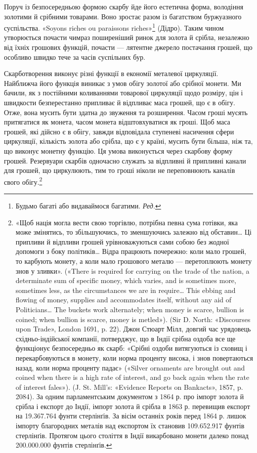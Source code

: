 Поруч із безпосередньою формою скарбу йде його естетична
форма, володіння золотими й срібними товарами. Воно зростає
разом із багатством буржуазного суспільства. «Soyons riches
ou paraissons riches»\footnote*{
Будьмо багаті або видаваймося багатими. \emph{Ред.}
} (Дідро). Таким чином утворюється почасти
чимраз поширеніший ринок для золота й срібла, незалежно від
їхніх грошових функцій, почасти — лятентне джерело постачання
грошей, що особливо швидко тече за часів суспільних бур.

Скарботворення виконує різні функції в економії металевої
циркуляції. Найближча його функція виникає з умов обігу золотої
або срібної монети. Ми бачили, як з постійними коливаннями
товарової циркуляції щодо розміру, цін і швидкости безперестанно
припливає й відпливає маса грошей, що є в обігу. Отже, вона
мусить бути здатна до звуження та розширення. Часом гроші
мусять притягатися як монета, часом монета відштовхуватися
як гроші. Щоб маса грошей, які дійсно є в обігу, завжди відповідала
ступеневі насичення сфери циркуляції, кількість золота
або срібла, що є у країні, мусить бути більша, ніж та, що виконує
монетну функцію. Ця умова виконується через скарбову
форму грошей. Резервуари скарбів одночасно служать за відпливні
й припливні канали для грошей, що циркулюють, тим то
гроші ніколи не переповнюють каналів свого обігу.\footnote{«Щоб нація могла вести свою торгівлю, потрібна певна сума
готівки, яка може змінятись, то збільшуючись, то зменшуючись залежно
від обставин\dots{} Ці припливи й відпливи грошей урівноважуються
сами собою без жодної допомоги з боку політиків\dots{} Відра працюють почережно:
коли мало грошей, то карбують монету, а коли мало грошового
металю — перетоплюють монету знов у зливки». («There is required for
carrying on the trade of the nation, a determinate sum of specific money,
which varies, and is sometimes more, sometimes less, as the circumstances
we are in require\dots{} This ebbing and flowing of money, supplies and accommodates
itself, without any aid of Politicians\dots{} The buckets work alternately;
when money is scarce, bullion is coined; when bullion is scarce, money
is metled»). (Sir D. North: «Discourses upon Trade», London 1691, p. 22).
Джон Стюарт Мілл, довгий час урядовець східньо-індійської компанії,
потверджує, що в Індії срібна оздоба все ще функціонує безпосередньо як
скарб: «Срібні оздоби витягуються із сховищ і перекарбовуються в монету,
коли норма проценту висока, і знов повертаються назад, коли норма проценту
падає» («Silver ornaments are brought out and coined when there
is a high rate of interest, and go back again when the rate of interest fales»).
(J. St. Mill’s: «Evidence Reports on Bankacts», 1857, p. 2084). За одним
парламентським документом з 1864 р. про імпорт золота й срібла і експорт
до Індії, імпорт золота й срібла в 1863 р. перевищив експорт на 19.367.764
фунти стерлінґів. За вісім останніх років перед 1864 р. лишок імпорту
благородних металів над експортом їх становив 109.652.917 фунтів стерлінґів.
Протягом цього століття в Індії викарбовано монети далеко понад
200.000.000 фунтів стерлінґів.}

